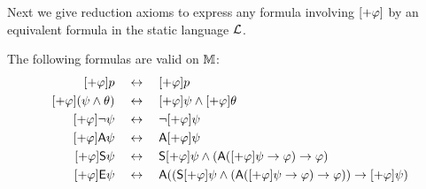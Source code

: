 Next we give reduction axioms to express any formula involving
$[+\varphi]$ by an equivalent formula in the static language
$\mathcal{L}$.

\begin{proposition}
\label{exp_prop_expinc_reduction_axioms}
The following formulas are valid on $\mathbb{M}$:
\[
\begin{aligned}
[\expinc\phi]p &\quad\liff\quad [\expinc\phi]p \\
[\expinc\phi](\psi \land \theta)
     &\quad\liff\quad [\expinc\phi]\psi \land [\expinc\phi]\theta \\
[\expinc\phi]\neg\psi &\quad\liff\quad \neg[\expinc\phi]\psi \\
[\expinc\phi]\A\psi &\quad\liff\quad \A[\expinc\phi]\psi \\
[\expinc\phi]\S\psi
    &\quad\liff\quad
         \S[\expinc\phi]\psi
         \land
         (
             \A([\expinc\phi]\psi \limplies \phi)
             \limplies
             \phi
         )
    \\
[\expinc\phi]\E\psi
    &\quad\liff\quad
     \A(
         (
             \S[\expinc\phi]\psi
             \land
             (
                 \A([\expinc\phi]\psi \limplies \phi)
                 \limplies
                 \phi
             )
         )
         \limplies
         [\expinc\phi]\psi
     )
\end{aligned}\]
\end{proposition}
